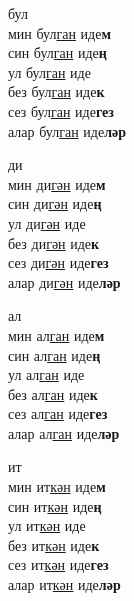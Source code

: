 \begin{multicols}{4}
\begin{enumerate}
\begin{minipage}{\linewidth}
    \item
    бул\\
    мин бул\underline{ган} иде\textbf{м}\\
    син бул\underline{ган} иде\textbf{ң}\\
    ул бул\underline{ган} иде\\
    без бул\underline{ган} иде\textbf{к}\\
    сез бул\underline{ган} иде\textbf{гез}\\
    алар бул\underline{ган} иде\textbf{ләр}\\
\end{minipage}

\begin{minipage}{\linewidth}
    \item
    ди\\
    мин ди\underline{гән} иде\textbf{м}\\
    син ди\underline{гән} иде\textbf{ң}\\
    ул ди\underline{гән} иде\\
    без ди\underline{гән} иде\textbf{к}\\
    сез ди\underline{гән} иде\textbf{гез}\\
    алар ди\underline{гән} иде\textbf{ләр}\\
\end{minipage}

\begin{minipage}{\linewidth}
    \item
    ал\\
    мин ал\underline{ган} иде\textbf{м}\\
    син ал\underline{ган} иде\textbf{ң}\\
    ул ал\underline{ган} иде\\
    без ал\underline{ган} иде\textbf{к}\\
    сез ал\underline{ган} иде\textbf{гез}\\
    алар ал\underline{ган} иде\textbf{ләр}\\
\end{minipage}

\begin{minipage}{\linewidth}
    \item
    ит\\
    мин ит\underline{кән} иде\textbf{м}\\
    син ит\underline{кән} иде\textbf{ң}\\
    ул ит\underline{кән} иде\\
    без ит\underline{кән} иде\textbf{к}\\
    сез ит\underline{кән} иде\textbf{гез}\\
    алар ит\underline{кән} иде\textbf{ләр}\\
\end{minipage}


\end{enumerate}
\end{multicols}
